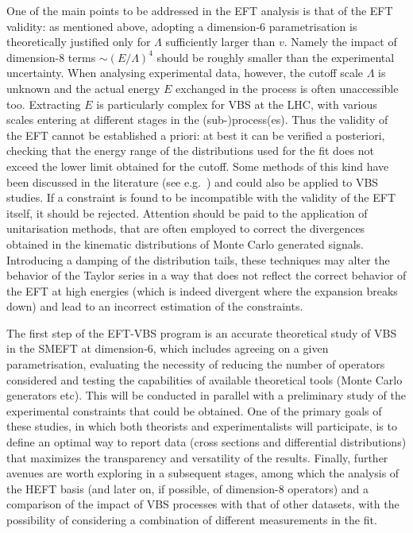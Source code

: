 One of the main points to be addressed in the EFT analysis is that of the EFT validity: as mentioned above, adopting a dimension-6 parametrisation is theoretically justified only for $\Lambda$ sufficiently larger than $v$. Namely the impact of dimension-8 terms $\sim (E/\Lambda)^4$ should be roughly smaller than the experimental uncertainty. When analysing experimental data, however, the cutoff scale $\Lambda$ is unknown and the actual energy $E$ exchanged in the process is often unaccessible too. Extracting $E$ is particularly complex for VBS at the LHC, with various scales entering at different stages in the (sub-)process(es).
Thus the validity of the EFT cannot be established a priori: at best it can be verified a posteriori, checking that the energy range of the distributions used for the fit does not exceed the lower limit obtained for the cutoff. Some methods of this kind have been discussed in the literature (see e.g.~\cite{Busoni:2013lha,Buchmueller:2013dya,Biekoetter:2014jwa,Englert:2014cva,Racco:2015dxa,Contino:2016jqw,Brivio:2017ije}) and could also be applied to VBS studies.
If a constraint is found to be incompatible with the validity of the EFT itself, it should be rejected.
Attention should be paid to the application of unitarisation methods, that are often employed to correct the divergences obtained in the kinematic distributions of Monte Carlo generated signals. Introducing a damping of the distribution tails, these techniques may alter the behavior of the Taylor series in a way that does not reflect the correct behavior of the EFT at high energies (which is indeed divergent where the expansion breaks down) and lead to an incorrect estimation of the constraints.

The first step of the EFT-VBS program is an accurate theoretical study of VBS in the SMEFT at dimension-6, which includes agreeing on a given parametrisation, evaluating the necessity of reducing the number of operators considered and testing the capabilities of available theoretical tools (Monte Carlo generators etc).
This will be conducted in parallel with a preliminary study of the experimental constraints that could be obtained. One of the primary goals of these studies, in which both theorists and experimentalists will participate, is to define an optimal way to report data (cross sections and differential distributions) that maximizes the transparency and versatility of the results.
Finally, further avenues are worth exploring in a subsequent stages, among which the analysis of the HEFT basis (and later on, if possible, of dimension-8 operators) and a comparison of the impact of VBS processes with that of other datasets, with the possibility of considering a combination of different measurements in the fit.



